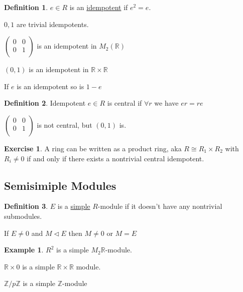 \documentclass{article}
\theoremstyle{definition}
\newtheorem*{example}{Example}
\newtheorem*{exercise}{Exercise}
\newtheorem*{definition}{Definition}
\begin{document}
\begin{definition}
    \(e\in R\) is an \underline{idempotent} if \(e^2 = e\). 

\end{definition}

\(0,1\) are trivial idempotents.

\(\begin{pmatrix}
    0 &  0 \\
    0 &  1 \\
\end{pmatrix}\) is an idempotent in \(M_2(\mathbb{R})\) 

\((0,1)\) is an idempotent in \(\mathbb{R} \times \mathbb{R} \) 

If \(e\) is an idempotent so is \(1 - e\) 

\begin{definition}
    Idempotent \(e\in R\) is central if \(\forall r\) we have \(er = re\) 
\end{definition}

\(\begin{pmatrix}
    0 &  0 \\
    0 &  1 \\
\end{pmatrix}\) is not central, but \((0,1)\) is.

\begin{exercise}

    A ring can be written as a product ring, aka \(R \cong R_1 \times R_2\) with \(R_i \neq 0\) if and only if there exists a nontrivial central idempotent.

\end{exercise}

\subsection*{Semisimiple Modules}

\begin{definition}
    \(E\) is a \underline{simple} \(R\)-module if it doesn't have any nontrivial submodules.

    If \(E \neq 0\) and \(M \triangleleft E\) then \(M \neq 0\) or \(M = E\) 
\end{definition}

\begin{example}

    \(R^2\) is a simple \(M_2\mathbb{R}\)-module.


    \(\mathbb{R} \times 0\) is a simple \(\mathbb{R} \times \mathbb{R}\) module.

    \(\mathbb{Z} / p\mathbb{Z}\) is a simple \(\mathbb{Z}\)-module

\end{example}
\end{document}
